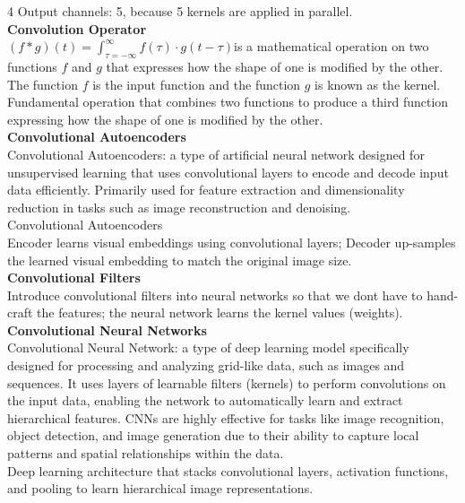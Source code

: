\documentclass[8pt]{extarticle}
\begin{document}
\begin{multicols}{4}
Output channels: 5, because 5 kernels are applied in parallel.\\
\vspace{2pt}\textbf{Convolution Operator}\\
$(f \ast g)(t) = \int_{\tau=-\infty}^{\infty} f(\tau)\cdot g(t-\tau)$\Convolution is a mathematical operation on two functions $f$ and $g$ that expresses how the shape of one is modified by the other. The function $f$ is the input function and the function $g$ is known as the kernel.\\
Fundamental operation that combines two functions to produce a third function expressing how the shape of one is modified by the other.\\
\vspace{2pt}\textbf{Convolutional Autoencoders}\\
Convolutional Autoencoders: a type of artificial neural network designed for unsupervised learning that uses convolutional layers to encode and decode input data efficiently. Primarily used for feature extraction and dimensionality reduction in tasks such as image reconstruction and denoising.\\
Convolutional Autoencoders\\
Encoder learns visual embeddings using convolutional layers; Decoder up-samples the learned visual embedding to match the original image size.\\
\vspace{2pt}\textbf{Convolutional Filters}\\
Introduce convolutional filters into neural networks so that we don\textquotesingle t have to hand-craft the features; the neural network learns the kernel values (weights).\\
\vspace{2pt}\textbf{Convolutional Neural Networks}\\
Convolutional Neural Network: a type of deep learning model specifically designed for processing and analyzing grid-like data, such as images and sequences. It uses layers of learnable filters (kernels) to perform convolutions on the input data, enabling the network to automatically learn and extract hierarchical features. CNNs are highly effective for tasks like image recognition, object detection, and image generation due to their ability to capture local patterns and spatial relationships within the data.\\
Deep learning architecture that stacks convolutional layers, activation functions, and pooling to learn hierarchical image representations.\\

\end{multicols}
\end{document}
